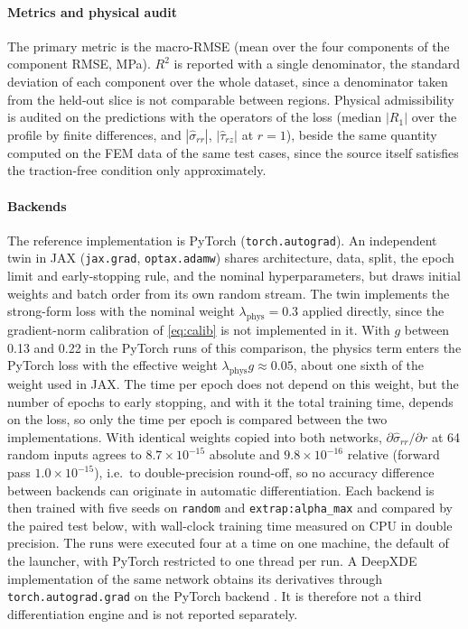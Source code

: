 \documentclass[pdflatex,sn-basic,Numbered]{sn-jnl}
\begin{document}
\paragraph{Metrics and physical audit}
The primary metric is the macro-RMSE (mean over the four components of the
component RMSE, MPa). $R^2$ is reported with a single denominator, the standard
deviation of each component over the whole dataset, since a denominator taken
from the held-out slice is not comparable between regions.
Physical admissibility is audited on the predictions with the operators of the
loss (median $|R_1|$ over the profile by finite differences, and $|\hat\sigma_{rr}|$,
$|\hat\tau_{rz}|$ at $r=1$), beside the same quantity computed on the FEM
data of the same test cases, since the source itself satisfies the traction-free
condition only approximately.

\paragraph{Backends}
The reference implementation is PyTorch (\texttt{torch.autograd}). An independent
twin in JAX (\texttt{jax.grad}, \texttt{optax.adamw}) shares architecture, data,
split, the epoch limit and early-stopping rule, and the nominal hyperparameters,
but draws initial weights and batch order from its own random stream.
The twin implements the strong-form loss with the nominal weight
$\lambda_{\mathrm{phys}}=0.3$ applied directly, since the gradient-norm calibration of
\eqref{eq:calib} is not implemented in it. With $g$ between 0.13 and 0.22 in the
PyTorch runs of this comparison, the physics term enters the PyTorch loss with the
effective weight $\lambda_{\mathrm{phys}}g\approx0.05$, about one sixth of the weight used in JAX.
The time per epoch does not depend on this weight, but the number of epochs to early
stopping, and with it the total training time, depends on the loss, so only the time
per epoch is compared between the two implementations.
With identical weights copied into both networks, $\partial\hat\sigma_{rr}/\partial r$
at 64 random inputs agrees to $8.7\times10^{-15}$ absolute and $9.8\times10^{-16}$
relative (forward pass $1.0\times10^{-15}$), i.e.\ to double-precision round-off,
so no accuracy difference between backends can originate in automatic
differentiation.
Each backend is then trained with five seeds on \texttt{random} and
\texttt{extrap:alpha\_max} and compared by the paired test below, with wall-clock
training time measured on CPU in double precision. The runs were executed four at a
time on one machine, the default of the launcher, with PyTorch restricted to one thread
per run.
A DeepXDE implementation of the same network obtains its derivatives through
\texttt{torch.autograd.grad} on the PyTorch backend \citep{lu2021}. It is therefore not a third
differentiation engine and is not reported separately.
\end{document}
